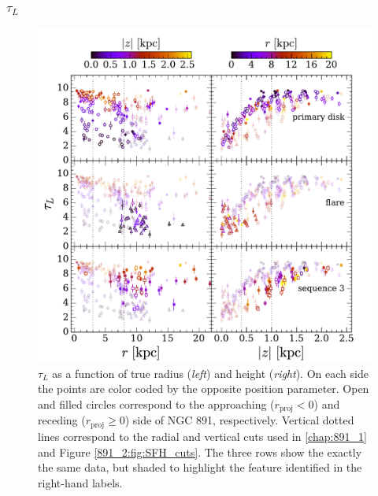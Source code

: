 



\subsubsection{{\Large $\tau_L$}}
\begin{figure}
  \centering
  \includegraphics[width=\textwidth]{891_2/figs/MLWA_rz_all.pdf}
  \caption[$\tau_L$ vs
    ($r,|z|$)]{\fixspacing\label{891_2:fig:MLWA_rz}$\tau_L$ as a
    function of true radius (\emph{left}) and height
    (\emph{right}). On each side the points are color coded by the
    opposite position parameter. Open and filled circles correspond to
    the approaching ($r_\mathrm{proj} < 0$) and receding
    ($r_\mathrm{proj}\geq 0$) side of NGC 891, respectively. Vertical
    dotted lines correspond to the radial and vertical cuts used in
    \ref{chap:891_1} and Figure \ref{891_2:fig:SFH_cuts}. The three
    rows show the exactly the same data, but shaded to highlight the
    feature identified in the right-hand labels.}
\end{figure}

